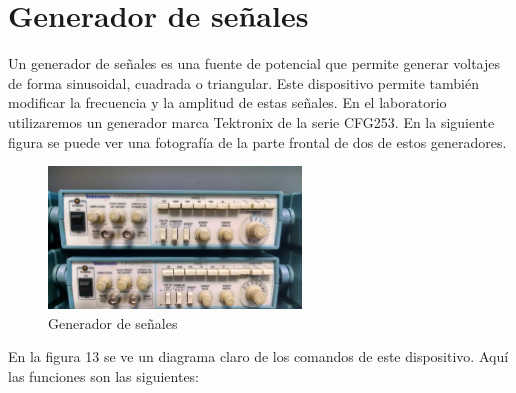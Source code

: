 \documentclass[12pt]{article}
\begin{document}
\section{Generador de señales}
Un generador de señales es una fuente de potencial que permite generar voltajes de forma sinusoidal, cuadrada o triangular. Este dispositivo permite también modificar la frecuencia y la amplitud de estas señales. En el laboratorio utilizaremos un generador marca Tektronix de la serie CFG253. En la siguiente figura se puede ver una fotografía de la parte frontal de dos de estos generadores.\\

\begin{figure}[h!]
	\centering
	\includegraphics[width=0.60\textwidth,height=0.25\textheight]{generador}
	\caption{Generador de señales}
\end{figure}

En la figura 13 se ve un diagrama claro de los comandos de este dispositivo. Aquí las funciones son las siguientes:
\end{document}
